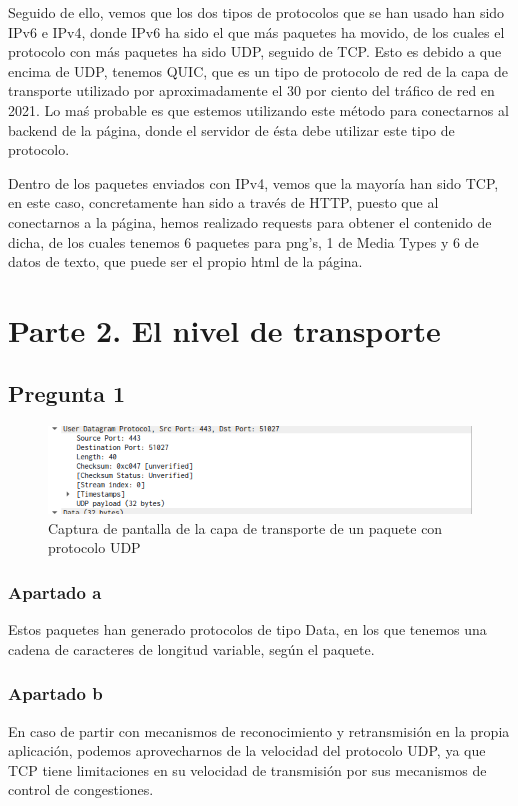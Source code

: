 \documentclass[spanish]{report} %
\begin{document}
Seguido de ello, vemos que los dos tipos de protocolos que se han usado han sido
IPv6 e IPv4, donde IPv6 ha sido el que más paquetes ha movido, de los cuales el
protocolo con más paquetes ha sido UDP, seguido de TCP. Esto es debido a que
encima de UDP, tenemos QUIC, que es un tipo de protocolo de red de la capa de
transporte utilizado por aproximadamente el 30 por ciento del tráfico de red en
2021. Lo maś probable es que estemos utilizando este método para conectarnos al
backend de la página, donde el servidor de ésta debe utilizar este tipo de
protocolo.\newline

Dentro de los paquetes enviados con IPv4, vemos que la mayoría han sido TCP, en
este caso, concretamente han sido a través de HTTP, puesto que al conectarnos a
la página, hemos realizado requests para obtener el contenido de dicha, de los
cuales tenemos 6 paquetes para png's, 1 de Media Types y 6 de datos de texto,
que puede ser el propio html de la página.


\newpage
\section{Parte 2. El nivel de transporte}

\subsection{Pregunta 1}

\begin{figure}[h]
\begin{center}
\includegraphics[scale=.5]{../img/4.png}
\end{center}
\caption{Captura de pantalla de la capa de transporte de un paquete con
protocolo UDP}
\end{figure}

\subsubsection{Apartado a}
Estos paquetes han generado protocolos de tipo Data, en los que tenemos una
cadena de caracteres de longitud variable, según el paquete.

\subsubsection{Apartado b}
En caso de partir con mecanismos de reconocimiento y retransmisión en la propia
aplicación, podemos aprovecharnos de la velocidad del protocolo UDP, ya que TCP
tiene limitaciones en su velocidad de transmisión por sus mecanismos de control
de congestiones.
\end{document}
